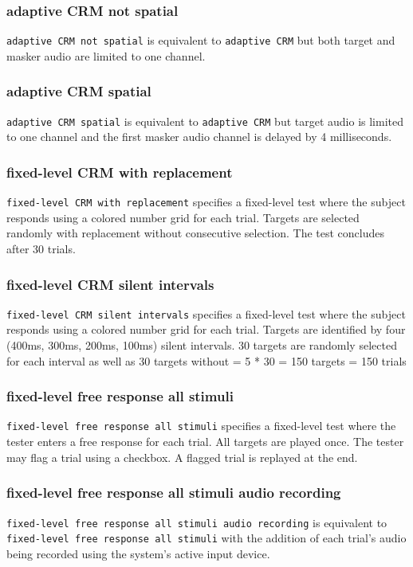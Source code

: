 \documentclass[11pt,pdftex,letterpaper]{article}
\begin{document}
\subsubsection{adaptive CRM not spatial}
\texttt{adaptive CRM not spatial} is equivalent to \texttt{adaptive CRM} but both target and masker audio are limited to one channel.
\subsubsection{adaptive CRM spatial}
\texttt{adaptive CRM spatial} is equivalent to \texttt{adaptive CRM} but target audio is limited to one channel and the first masker audio channel is delayed by 4 milliseconds.
\subsubsection{fixed-level CRM with replacement}
\texttt{fixed-level CRM with replacement} specifies a fixed-level test where the subject responds using a colored number grid for each trial. Targets are selected randomly with replacement without consecutive selection. The test concludes after 30 trials.
\subsubsection{fixed-level CRM silent intervals}
\texttt{fixed-level CRM silent intervals} specifies a fixed-level test where the subject responds using a colored number grid for each trial. Targets are identified by four (400ms, 300ms, 200ms, 100ms) silent intervals. 30 targets are randomly selected for each interval as well as 30 targets without = 5 * 30 = 150 targets = 150 trials
\subsubsection{fixed-level free response all stimuli}
\texttt{fixed-level free response all stimuli} specifies a fixed-level test where the tester enters a free response for each trial. All targets are played once. The tester may flag a trial using a checkbox. A flagged trial is replayed at the end.
\subsubsection{fixed-level free response all stimuli audio recording}
\texttt{fixed-level free response all stimuli audio recording} is equivalent to \texttt{fixed-level free response all stimuli} with the addition of each trial's audio being recorded using the system's active input device.
\end{document}
